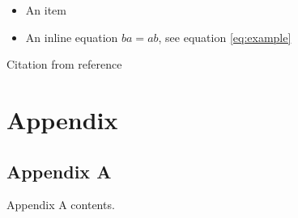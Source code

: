 \documentclass[11pt]{article} %
\begin{document}
	\begin{itemize}
		\item An item 
		\item An inline equation $ba = ab$, see equation \ref{eq:example} %
	\end{itemize}
	
	Citation from reference \autocite{glad-06}
		
	\pagebreak
		
	\setcounter{secnumdepth}{0} %
	
	\printbibliography %
	
	\pagebreak
	
	\section{Appendix}
	\subsection{Appendix A} %
	
	Appendix A contents.
\end{document}
